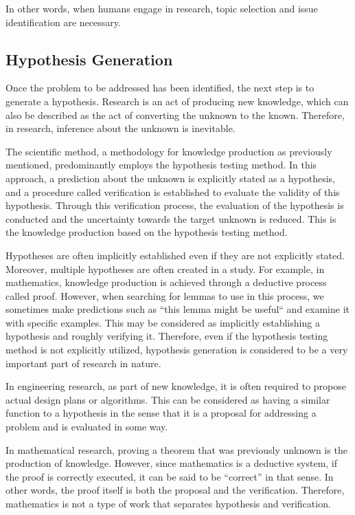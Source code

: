 \documentclass{book}
\begin{document}
In other words, when humans engage in research, topic selection and issue identification are necessary.

\subsection{Hypothesis Generation}
Once the problem to be addressed has been identified, the next step is to generate a hypothesis. Research is an act of producing new knowledge, which can also be described as the act of converting the unknown to the known. Therefore, in research, inference about the unknown is inevitable. 

The scientific method, a methodology for knowledge production as previously mentioned, predominantly employs the hypothesis testing method. In this approach, a prediction about the unknown is explicitly stated as a hypothesis, and a procedure called verification is established to evaluate the validity of this hypothesis. Through this verification process, the evaluation of the hypothesis is conducted and the uncertainty towards the target unknown is reduced. This is the knowledge production based on the hypothesis testing method.

Hypotheses are often implicitly established even if they are not explicitly stated. Moreover, multiple hypotheses are often created in a study. For example, in mathematics, knowledge production is achieved through a deductive process called proof. However, when searching for lemmas to use in this process, we sometimes make predictions such as ``this lemma might be useful`` and examine it with specific examples. This may be considered as implicitly establishing a hypothesis and roughly verifying it. Therefore, even if the hypothesis testing method is not explicitly utilized, hypothesis generation is considered to be a very important part of research in nature.

In engineering research, as part of new knowledge, it is often required to propose actual design plans or algorithms. This can be considered as having a similar function to a hypothesis in the sense that it is a proposal for addressing a problem and is evaluated in some way.

In mathematical research, proving a theorem that was previously unknown is the production of knowledge. However, since mathematics is a deductive system, if the proof is correctly executed, it can be said to be ``correct'' in that sense. In other words, the proof itself is both the proposal and the verification. Therefore, mathematics is not a type of work that separates hypothesis and verification.
\end{document}
